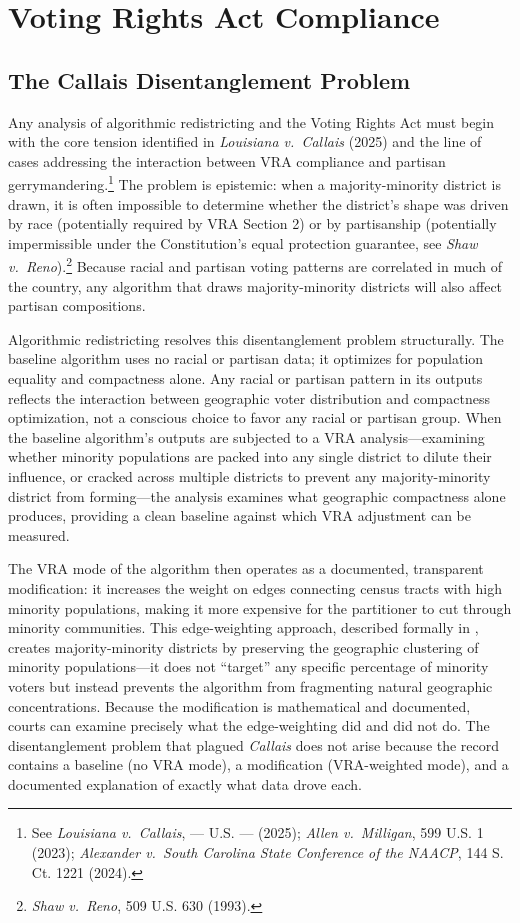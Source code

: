 \section{Voting Rights Act Compliance}
\label{sec:vra}

\subsection{The Callais Disentanglement Problem}

Any analysis of algorithmic redistricting and the Voting Rights Act must begin with the core tension identified in \textit{Louisiana v.\ Callais} (2025) and the line of cases addressing the interaction between VRA compliance and partisan gerrymandering.\footnote{See \textit{Louisiana v.\ Callais}, --- U.S. --- (2025); \textit{Allen v.\ Milligan}, 599 U.S. 1 (2023); \textit{Alexander v.\ South Carolina State Conference of the NAACP}, 144 S. Ct. 1221 (2024).} The problem is epistemic: when a majority-minority district is drawn, it is often impossible to determine whether the district's shape was driven by race (potentially required by VRA Section 2) or by partisanship (potentially impermissible under the Constitution's equal protection guarantee, see \textit{Shaw v.\ Reno}).\footnote{\textit{Shaw v.\ Reno}, 509 U.S. 630 (1993).} Because racial and partisan voting patterns are correlated in much of the country, any algorithm that draws majority-minority districts will also affect partisan compositions.

Algorithmic redistricting resolves this disentanglement problem structurally. The baseline algorithm uses no racial or partisan data; it optimizes for population equality and compactness alone. Any racial or partisan pattern in its outputs reflects the interaction between geographic voter distribution and compactness optimization, not a conscious choice to favor any racial or partisan group. When the baseline algorithm's outputs are subjected to a VRA analysis---examining whether minority populations are packed into any single district to dilute their influence, or cracked across multiple districts to prevent any majority-minority district from forming---the analysis examines what geographic compactness alone produces, providing a clean baseline against which VRA adjustment can be measured.

The VRA mode of the algorithm then operates as a documented, transparent modification: it increases the weight on edges connecting census tracts with high minority populations, making it more expensive for the partitioner to cut through minority communities. This edge-weighting approach, described formally in \citet{dellaLibera2026vra}, creates majority-minority districts by preserving the geographic clustering of minority populations---it does not ``target'' any specific percentage of minority voters but instead prevents the algorithm from fragmenting natural geographic concentrations. Because the modification is mathematical and documented, courts can examine precisely what the edge-weighting did and did not do. The disentanglement problem that plagued \textit{Callais} does not arise because the record contains a baseline (no VRA mode), a modification (VRA-weighted mode), and a documented explanation of exactly what data drove each.


